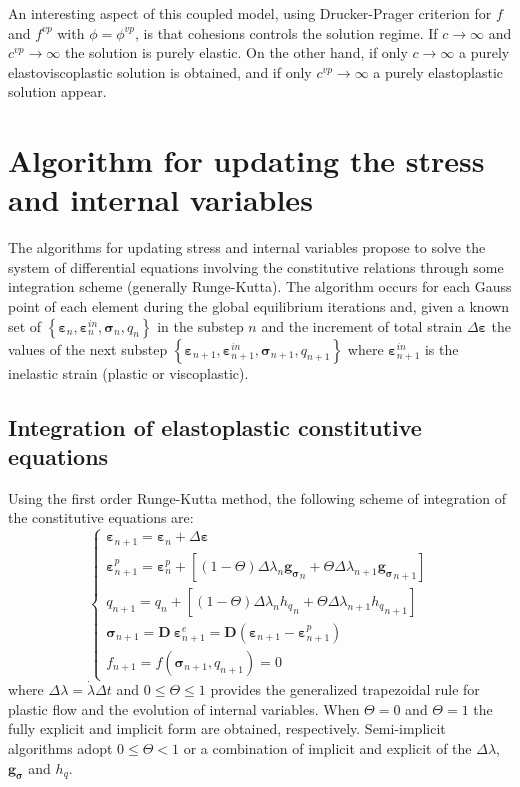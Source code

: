 \documentclass[Journal,letterpaper]{ascelike-new}
\newcommand{\dgds}{\boldsymbol{g_\sigma}}
\newcommand{\Dsdee}{\boldsymbol{D}}
\newcommand{\hl}{{h_q}}
\newcommand{\strain}{\boldsymbol{\varepsilon}}
\newcommand{\stress}{\boldsymbol{\sigma}}
\begin{document}
An interesting aspect of this coupled model, using Drucker-Prager criterion for $f$ and $f^{vp}$ with $\phi=\phi^{vp}$, is that cohesions controls the solution regime. If $c \rightarrow \infty$ and $c^{vp} \rightarrow \infty$ the solution is purely elastic. On the other hand, if only $c \rightarrow \infty$ a purely elastoviscoplastic solution is obtained, and if only $c^{vp} \rightarrow \infty$ a purely elastoplastic solution appear.

\section{Algorithm for updating the stress and internal variables}

The algorithms for updating stress and internal variables propose to solve the system of differential equations involving the constitutive relations through some integration scheme (generally Runge-Kutta). The algorithm occurs for each Gauss point of each element during the global equilibrium iterations and, given a known set of $\left\{ \strain_n, \strain_n^{in},\stress_n,q_n \right\}$ in the substep $n$ and the increment of total strain $\Delta \strain$ the values of the next substep $\left\{ \strain_{n+1}, \strain_{n+1}^{in},\stress_{n+1},q_{n+1} \right\}$ where $\strain_{n+1}^{in}$ is the inelastic strain (plastic or viscoplastic).

\subsection{Integration of elastoplastic constitutive equations}

Using the first order Runge-Kutta method, the following scheme of integration of the constitutive equations are:
\begin{equation}
	\label{eq:esquema_int_constitutiva_ep}
	\left\{
\begin{array}{lcl}
	\strain_{n+1} = \strain_n + \Delta \strain \\
	\strain_{n+1}^p = \strain_n^p + \left[(1-\Theta) \Delta \lambda_n \dgds_n + \Theta \Delta \lambda_{n+1} \dgds_{n+1}\right] \\
	q_{n+1} = q_n + \left[(1-\Theta) \Delta \lambda_n \hl_n + \Theta \Delta \lambda_{n+1} \hl_{n+1}\right] \\	
	\stress_{n+1} = \Dsdee~\strain_{n+1}^e = \Dsdee( \strain_{n+1} - \strain_{n+1}^p) \\
	f_{n+1} = f(\stress_{n+1},q_{n+1}) = 0		
\end{array}
\right.
\end{equation}
where $\Delta \lambda = \dot\lambda\Delta t$ and $0 \leq \Theta \leq 1$ provides the generalized trapezoidal rule for  plastic flow and the evolution of internal variables. When $\Theta = 0$ and $\Theta = 1$ the fully explicit and implicit form are obtained, respectively. Semi-implicit algorithms adopt $0 \leq \Theta < 1$ or a combination of implicit and explicit of the $\Delta \lambda$, $\dgds$ and $\hl$. 
\end{document}
